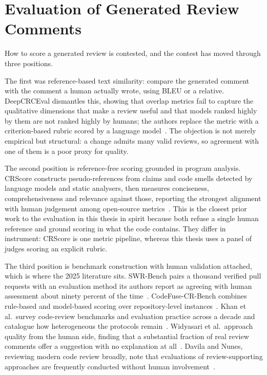 \section{Evaluation of Generated Review Comments}
\label{sec:sota-evaluation}

How to score a generated review is contested, and the contest has moved through
three positions.

The first was reference-based text similarity: compare the generated comment with
the comment a human actually wrote, using BLEU or a relative. DeepCRCEval
dismantles this, showing that overlap metrics fail to capture the qualitative
dimensions that make a review useful and that models ranked highly by them are not
ranked highly by humans; the authors replace the metric with a criterion-based
rubric scored by a language model~\cite{hong2024deepcrceval}. The objection is not
merely empirical but structural: a change admits many valid reviews, so agreement
with one of them is a poor proxy for quality.

The second position is reference-free scoring grounded in program analysis.
CRScore constructs pseudo-references from claims and code smells detected by
language models and static analysers, then measures conciseness,
comprehensiveness and relevance against those, reporting the strongest alignment
with human judgement among open-source metrics~\cite{naik2025crscore}. This is
the closest prior work to the evaluation in this thesis in spirit because both
refuse a single human reference and ground scoring in what the code contains.
They differ in instrument: CRScore is one metric pipeline, whereas this thesis
uses a panel of judges scoring an explicit rubric.

The third position is benchmark construction with human validation attached, which
is where the 2025 literature sits. SWR-Bench pairs a thousand verified pull
requests with an evaluation method its authors report as agreeing with human
assessment about ninety percent of the time~\cite{zeng2025swrbench}. CodeFuse-CR-Bench
combines rule-based and model-based scoring over repository-level
instances~\cite{guo2025codefusecrbench}. Khan et al.\ survey code-review
benchmarks and evaluation practice across a decade and catalogue how heterogeneous
the protocols remain~\cite{khan2026crsurvey}. Widyasari et al.\ approach quality
from the human side, finding that a substantial fraction of real review comments
offer a suggestion with no explanation at
all~\cite{widyasari2025explanations}. Davila and Nunes, reviewing modern code review
broadly, note that evaluations of review-supporting approaches are frequently
conducted without human involvement~\cite{davila2021mcrslr}.

